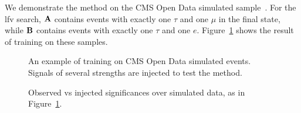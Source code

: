 \documentclass[paper/ddppaper2.tex]{subfiles}
\begin{document}
We demonstrate the method on the CMS Open Data simulated sample~\cite{CMS_OpenData_VVTo2L2Nu_2016}. For the \gls{lfv} search, ${\mathbf{A}}$ contains events with exactly one $\tau$ and one $\mu$ in the final state, while ${\mathbf{B}}$ contains events with exactly one $\tau$ and one $e$. Figure~\ref{fig:cms_open_data_train} shows the result of training on these samples.

\begin{figure}
    \caption{An example of training on CMS Open Data simulated events. Signals of several strengths are injected to test the method.}
    \label{fig:cms_open_data_train}
\end{figure}


\begin{figure}
    \caption{Observed vs injected significances over simulated data, as in Figure~\ref{fig:cms_open_data_train}.}
    \label{fig:cms_open_data_significances}
\end{figure}
\end{document}
